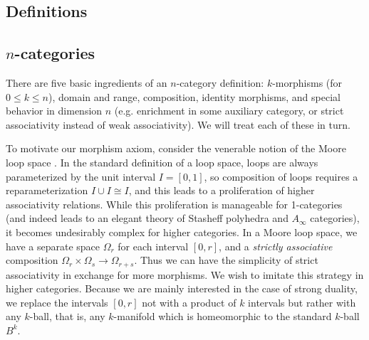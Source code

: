 \documentclass{pnastwo}
\begin{document}
\begin{article}
\section{Definitions}
\subsection{$n$-categories} \mbox{}





There are five basic ingredients of an $n$-category definition:
$k$-morphisms (for $0\le k \le n$), domain and range, composition,
identity morphisms, and special behavior in dimension $n$ (e.g. enrichment
in some auxiliary category, or strict associativity instead of weak associativity).
We will treat each of these in turn.

To motivate our morphism axiom, consider the venerable notion of the Moore loop space
.
In the standard definition of a loop space, loops are always parameterized by the unit interval $I = [0,1]$,
so composition of loops requires a reparameterization $I\cup I \cong I$, and this leads to a proliferation
of higher associativity relations.
While this proliferation is manageable for 1-categories (and indeed leads to an elegant theory
of Stasheff polyhedra and $A_\infty$ categories), it becomes undesirably complex for higher categories.
In a Moore loop space, we have a separate space $\Omega_r$ for each interval $[0,r]$, and a 
{\it strictly associative} composition $\Omega_r\times \Omega_s\to \Omega_{r+s}$.
Thus we can have the simplicity of strict associativity in exchange for more morphisms.
We wish to imitate this strategy in higher categories.
Because we are mainly interested in the case of strong duality, we replace the intervals $[0,r]$ not with
a product of $k$ intervals  but rather with any $k$-ball, that is, any $k$-manifold which is homeomorphic
to the standard $k$-ball $B^k$.


\end{article}
\end{document}
